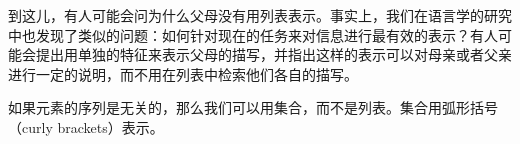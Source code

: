 \ea
{}
\z

到这儿，有人可能会问为什么父母没有用列表表示。事实上，我们在语言学的研究中也发现了类似的问题：如何针对现在的任务来对信息进行最有效的表示？有人可能会提出用单独的特征来表示父母的描写，并指出这样的表示可以对母亲或者父亲进行一定的说明，而不用在列表中检索他们各自的描写。

\largerpage[2]
如果元素的序列是无关的，那么我们可以用集合，而不是列表。集合用弧形括号（curly brackets）表示。

